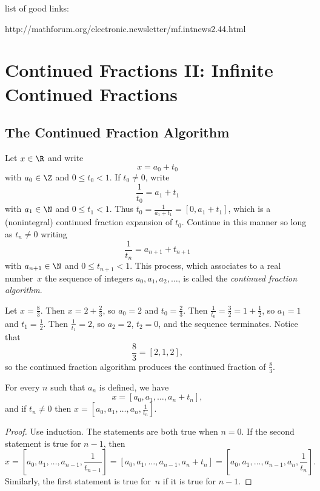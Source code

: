 \documentclass[11pt]{report}
\begin{document}
list of good links:

http://mathforum.org/electronic.newsletter/mf.intnews2.44.html


\chapter{Continued Fractions II: Infinite Continued Fractions}

\section{The Continued Fraction Algorithm}
Let $x\in\R$ and write
$$x = a_0 + t_0$$
with $a_0\in\Z$ and $0\leq t_0 < 1$.  If $t_0\neq 0$, write
$$\frac{1}{t_0} = a_1 + t_1$$ with $a_1\in\N$ and $0\leq t_1 < 1$.
Thus $t_0 = \frac{1}{a_1 + t_1}=[0,a_1+t_1]$, which is a (nonintegral)
continued fraction expansion of $t_0$.  Continue in this manner
so long as $t_n\neq 0$ writing
$$\frac{1}{t_n} = a_{n+1} + t_{n+1}$$
with $a_{n+1}\in\N$ and $0\leq t_{n+1}<1$.
This process, which associates to a real number~$x$ the sequence
of integers $a_0, a_1, a_2, \ldots $, is called the
  {\em continued fraction algorithm}.

\begin{example}
  Let $x=\frac{8}{3}$.  Then $x=2+\frac{2}{3}$, so
  $a_0=2$ and $t_0=\frac{2}{3}$.  Then
  $\frac{1}{t_0}=\frac{3}{2} = 1+\frac{1}{2}$, so $a_1=1$ and $t_1=\frac{1}{2}$.
  Then $\frac{1}{t_1} = 2$, so $a_2=2$, $t_2=0$, and the sequence terminates.
  Notice that
  $$ \frac{8}{3} = [2,1,2],$$
  so the continued fraction algorithm produces the
  continued fraction of $\frac{8}{3}$.
\end{example}


\begin{proposition}\label{prop1}
  For every $n$ such that $a_n$ is defined, we have
  $$x = [a_0, a_1, \ldots, a_{n}+t_n],$$
  and if $t_{n}\neq 0$ then
  $
    x = [a_0, a_1, \ldots, a_{n}, \frac{1}{t_n}].
  $
\end{proposition}

\begin{proof}
  Use induction.  The statements are both true when $n=0$.
  If the second statement is true for $n-1$, then
  $$
    x = [a_0,a_1, \ldots, a_{n-1},\frac{1}{t_{n-1}}]
    =[a_0,a_1, \ldots, a_{n-1},a_n + t_n]
    =[a_0,a_1, \ldots, a_{n-1},a_n, \frac{1}{t_n}].$$
  Similarly, the first statement is true for~$n$ if
  it is true for $n-1$.

\end{proof}
\end{document}
